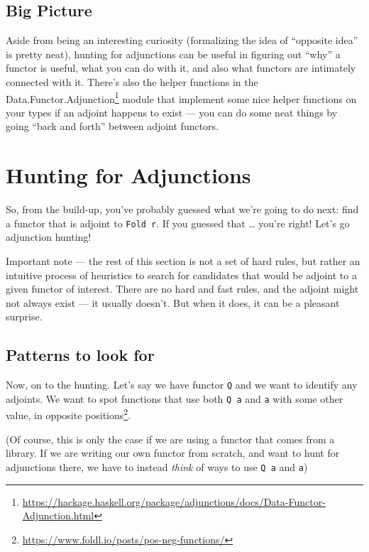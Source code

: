 \documentclass[]{article}
\renewcommand{\href}[2]{#2\footnote{\url{#1}}}
\begin{document}
\hypertarget{big-picture}{%
\subsection{Big Picture}\label{big-picture}}

Aside from being an interesting curiosity (formalizing the idea of ``opposite
idea'' is pretty neat), hunting for adjunctions can be useful in figuring out
``why'' a functor is useful, what you can do with it, and also what functors are
intimately connected with it. There's also the helper functions in the
\href{https://hackage.haskell.org/package/adjunctions/docs/Data-Functor-Adjunction.html}{Data.Functor.Adjunction}
module that implement some nice helper functions on your types if an adjoint
happens to exist --- you can do some neat things by going ``back and forth''
between adjoint functors.

\hypertarget{hunting-for-adjunctions}{%
\section{Hunting for Adjunctions}\label{hunting-for-adjunctions}}

So, from the build-up, you've probably guessed what we're going to do next: find
a functor that is adjoint to \texttt{Fold\ r}. If you guessed that \ldots{}
you're right! Let's go adjunction hunting!

Important note --- the rest of this section is not a set of hard rules, but
rather an intuitive process of heuristics to search for candidates that would be
adjoint to a given functor of interest. There are no hard and fast rules, and
the adjoint might not always exist --- it usually doesn't. But when it does, it
can be a pleasant surprise.

\hypertarget{patterns-to-look-for}{%
\subsection{Patterns to look for}\label{patterns-to-look-for}}

Now, on to the hunting. Let's say we have functor \texttt{Q} and we want to
identify any adjoints. We want to spot functions that use both \texttt{Q\ a} and
\texttt{a} with some other value, in
\href{https://www.foldl.io/posts/pos-neg-functions/}{opposite positions}.

(Of course, this is only the case if we are using a functor that comes from a
library. If we are writing our own functor from scratch, and want to hunt for
adjunctions there, we have to instead \emph{think} of ways to use \texttt{Q\ a}
and \texttt{a})
\end{document}

